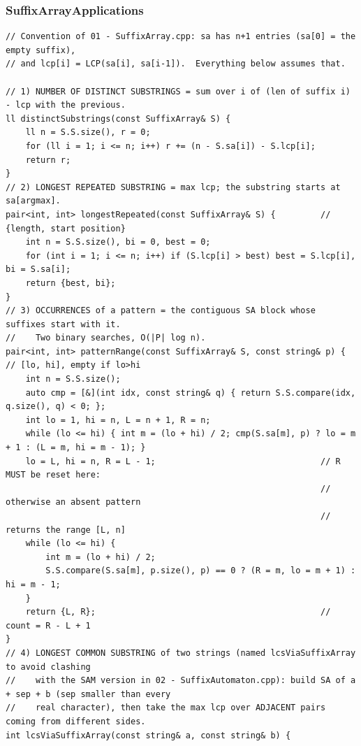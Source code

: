 \documentclass[9pt,a4paper,twocolumn]{extarticle}
\begin{document}
\filbreak
\subsubsection{SuffixArrayApplications}
\nopagebreak
\begin{lstlisting}
// Convention of 01 - SuffixArray.cpp: sa has n+1 entries (sa[0] = the empty suffix),
// and lcp[i] = LCP(sa[i], sa[i-1]).  Everything below assumes that.

// 1) NUMBER OF DISTINCT SUBSTRINGS = sum over i of (len of suffix i) - lcp with the previous.
ll distinctSubstrings(const SuffixArray& S) {
    ll n = S.S.size(), r = 0;
    for (ll i = 1; i <= n; i++) r += (n - S.sa[i]) - S.lcp[i];
    return r;
}
// 2) LONGEST REPEATED SUBSTRING = max lcp; the substring starts at sa[argmax].
pair<int, int> longestRepeated(const SuffixArray& S) {         // {length, start position}
    int n = S.S.size(), bi = 0, best = 0;
    for (int i = 1; i <= n; i++) if (S.lcp[i] > best) best = S.lcp[i], bi = S.sa[i];
    return {best, bi};
}
// 3) OCCURRENCES of a pattern = the contiguous SA block whose suffixes start with it.
//    Two binary searches, O(|P| log n).
pair<int, int> patternRange(const SuffixArray& S, const string& p) {   // [lo, hi], empty if lo>hi
    int n = S.S.size();
    auto cmp = [&](int idx, const string& q) { return S.S.compare(idx, q.size(), q) < 0; };
    int lo = 1, hi = n, L = n + 1, R = n;
    while (lo <= hi) { int m = (lo + hi) / 2; cmp(S.sa[m], p) ? lo = m + 1 : (L = m, hi = m - 1); }
    lo = L, hi = n, R = L - 1;                                 // R MUST be reset here:
                                                               // otherwise an absent pattern
                                                               // returns the range [L, n]
    while (lo <= hi) {
        int m = (lo + hi) / 2;
        S.S.compare(S.sa[m], p.size(), p) == 0 ? (R = m, lo = m + 1) : hi = m - 1;
    }
    return {L, R};                                             // count = R - L + 1
}
// 4) LONGEST COMMON SUBSTRING of two strings (named lcsViaSuffixArray to avoid clashing
//    with the SAM version in 02 - SuffixAutomaton.cpp): build SA of a + sep + b (sep smaller than every
//    real character), then take the max lcp over ADJACENT pairs coming from different sides.
int lcsViaSuffixArray(const string& a, const string& b) {

\end{lstlisting}
\end{document}
